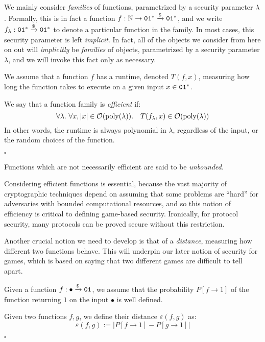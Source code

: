 We mainly consider \emph{families} of functions,
parametrized by a security parameter $\lambda$.
Formally, this is in fact a function $f : \mathbb{N} \to \texttt{01}^* \xrightarrow{\$} \texttt{01}^*$,
and we write $f_{\lambda} : \texttt{01}^* \xrightarrow{\$} \texttt{01}^*$ to denote a particular
function in the family.
In most cases, this security parameter is left \emph{implicit}.
In fact, all of the objects we consider from here on out will \emph{implicitly}
be \emph{families} of objects, parametrized by a security parameter $\lambda$,
and we will invoke this fact only as necessary.

\begin{definition}
    We assume that a function $f$ has a runtime, denoted $T(f, x)$,
    measuring how long the function takes to execute on a given input $x \in \texttt{01}^*$.

    We say that a function family is \emph{efficient} if:
    $$
    \forall \lambda.\ \forall x, |x| \in \mathcal{O}(\text{poly}(\lambda)).\quad T(f_\lambda, x) \in \mathcal{O}(\text{poly}(\lambda))
    $$
    In other words, the runtime is always polynomial in $\lambda$, regardless
    of the input, or the random choices of the function.

    $\square$
\end{definition}

Functions which are not necessarily efficient are said to be \emph{unbounded}.

Considering efficient functions is essential, because the vast majority
of cryptographic techniques depend on assuming that some problems are ``hard''
for adversaries with bounded computational resources,
and so this notion of efficiency is critical to defining game-based
security.
Ironically, for protocol security, many protocols can be proved secure
without this restriction.

Another crucial notion we need to develop is that of a \emph{distance},
measuring how different two functions behave.
This will underpin our later notion of security for games,
which is based on saying that two different games are difficult
to tell apart.

\begin{definition}
    Given a function $f : \bullet \xrightarrow{\$} \texttt{01}$, we assume that the probability
    $P[f \to 1]$ of the function returning $1$ on the input $\bullet$ is well defined.

    Given two functions $f, g$, we define their distance $\varepsilon(f, g)$ as:
    $$
    \varepsilon(f, g) := |P[f \to 1] - P[g \to 1]|
    $$

    $\square$
\end{definition}

